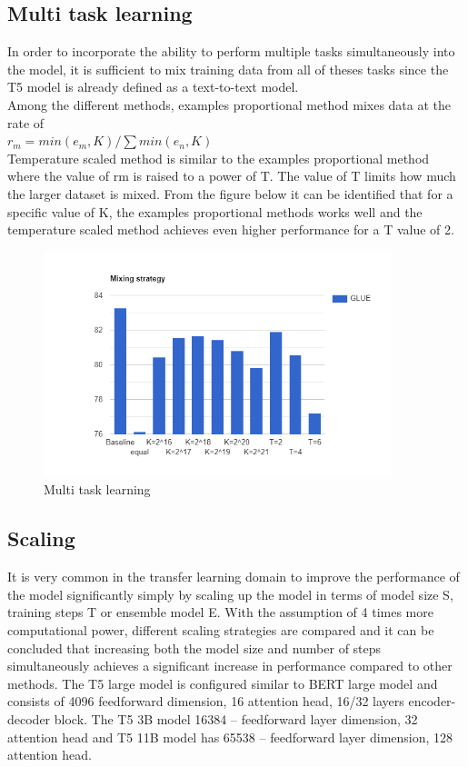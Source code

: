 \subsection{Multi task learning}
In order to incorporate the ability to perform multiple tasks simultaneously into the model, it is sufficient to mix training data from all of theses tasks since the T5 model is already defined as a text-to-text model. \\
Among the different methods, examples proportional method mixes data at the rate of  \\
\(r_{m} = min( e_{m},K)/ \sum min( e_{n},K)  \)
\\ Temperature scaled method is similar to the examples proportional method where the value of rm is raised to a power of T. The value of T limits how much the larger dataset is mixed. 
From the figure below it can be identified that for a specific value of K, the examples proportional methods works well and the temperature scaled method achieves even higher performance for a T value of 2. 

\begin{figure}[H]
\centering
\includegraphics[width=0.9\textwidth]{images/multitask.png}
\caption{Multi task learning}
\label{fig:multitask}
\end{figure}

\subsection{Scaling}
It is very common in the transfer learning domain to improve the performance of the model significantly simply by scaling up the model in terms of model size S, training steps T or ensemble model E. 
With the assumption of 4 times more computational power, different scaling strategies are compared and it can be concluded that increasing both the model size and number of steps simultaneously achieves a significant increase in performance compared to other methods. 
The T5 large model is configured similar to BERT large model and consists of 4096 feedforward dimension, 16 attention head, 16/32 layers encoder-decoder block. The T5 3B model 16384 – feedforward layer dimension, 32 attention head and T5 11B model has 65538 – feedforward layer dimension, 128 attention head.